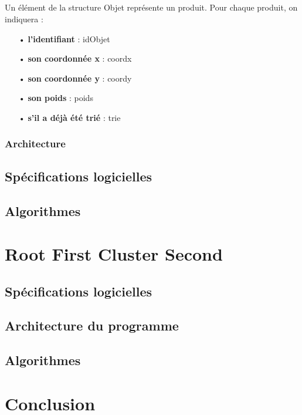 \documentclass[twoside,UTF8]{EPURapport}
\begin{document}
\paragraph{}
Un élément de la structure Objet représente un produit. Pour chaque produit, on indiquera : 
\begin{itemize}
\item[•]\textbf{l'identifiant} : idObjet
\item[•]\textbf{son coordonnée x} : coordx
\item[•]\textbf{son coordonnée y} : coordy 
\item[•]\textbf{son poids} : poids
\item[•]\textbf{s'il a déjà été trié} : trie
\end{itemize}


\subsection{Architecture}



\section{Spécifications logicielles}


\section{Algorithmes}


\chapter{Root First Cluster Second}

\section{Spécifications logicielles}

\section{Architecture du programme}

\section{Algorithmes}


\chapter{Conclusion}

\end{document}
